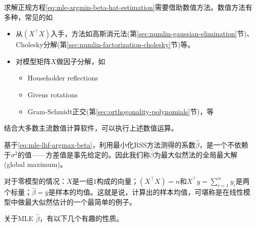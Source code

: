 求解正规方程\eqref{eq:mle-argmin-beta-hat-estimation}需要借助数值方法。数值方法有多种，常见的如
\begin{itemize}
  \item 从$\left( X^{\top} X \right)$入手，方法如高斯消元法(第\ref{sec:numlin-gaussian-elimination}节)、Cholesky分解(第\ref{sec:numlin-factorization-cholesky}节)等。
  \item 对模型矩阵$X$做因子分解，如
  \begin{itemize}
    \item Householder reflections
    \item Givens rotations
    \item Gram-Schmidt正交(第\ref{sec:orthogonality-polynomials}节)，等
  \end{itemize}
\end{itemize}
结合大多数主流数值计算软件，可以执行上述数值运算。

基于\eqref{eq:mle-lhf-argmax-beta}，利用最小化RSS方法测得的系数$\hat{\beta}$，是一个不依赖于$\sigma^{2}$的值——方差值是事先给定的。因此我们称$\hat{\beta}$为最大似然法的全局最大解(global maximum)。

对于零模型的情况：$X$是一组$1$构成的向量；$\left( X^{\top} X \right) = n$和$X^{\top} y = \sum_{i=1}^{n} y_{i}$是两个标量；$\hat{\beta} = \bar{y}$是样本的均值。这就是说，计算出的样本均值，可堪称是在线性模型中做最大似然估计的一个最简单的例子。

关于MLE $\hat{\beta}$，有以下几个有趣的性质。

